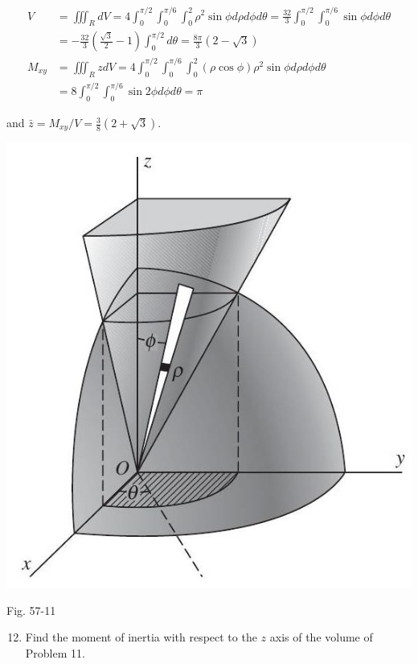 \documentclass[10pt]{article}
\begin{document}
$$
\begin{aligned}
V & =\iiint_{R} d V=4 \int_{0}^{\pi / 2} \int_{0}^{\pi / 6} \int_{0}^{2} \rho^{2} \sin \phi d \rho d \phi d \theta=\frac{32}{3} \int_{0}^{\pi / 2} \int_{0}^{\pi / 6} \sin \phi d \phi d \theta \\
& =-\frac{32}{3}\left(\frac{\sqrt{3}}{2}-1\right) \int_{0}^{\pi / 2} d \theta=\frac{8 \pi}{3}(2-\sqrt{3}) \\
M_{x y} & =\iiint_{R} z d V=4 \int_{0}^{\pi / 2} \int_{0}^{\pi / 6} \int_{0}^{2}(\rho \cos \phi) \rho^{2} \sin \phi d \rho d \phi d \theta \\
& =8 \int_{0}^{\pi / 2} \int_{0}^{\pi / 6} \sin 2 \phi d \phi d \theta=\pi
\end{aligned}
$$

and $\bar{z}=M_{x y} / V=\frac{3}{8}(2+\sqrt{3})$.

\begin{center}
\includegraphics[max width=\textwidth]{2024_04_20_fe2e8e718cc0fcd63d1bg-08}
\end{center}

Fig. 57-11

\begin{enumerate}
  \setcounter{enumi}{11}
  \item Find the moment of inertia with respect to the $z$ axis of the volume of Problem 11.
\end{enumerate}
\end{document}
